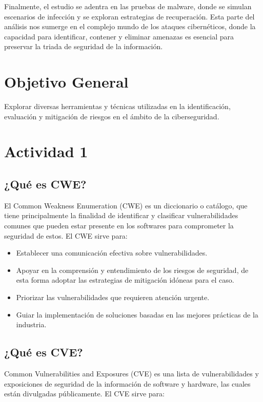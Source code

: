 \documentclass[stu, 11pt, letterpaper, donotrepeattitle, floatsintext, natbib]{apa7}
\begin{document}
Finalmente, el estudio se adentra en las pruebas de malware, donde se simulan escenarios de infección y se exploran estrategias de recuperación. Esta parte del análisis nos sumerge en el complejo mundo de los ataques cibernéticos, donde la capacidad para identificar, contener y eliminar amenazas es esencial para preservar la triada de seguridad de la información. 

\hfill \break 
\section{\large Objetivo General}

Explorar diversas herramientas y técnicas utilizadas en la identificación, evaluación y mitigación de riesgos en el ámbito de la ciberseguridad. 

\newpage

\section{\large Actividad 1}

\subsection{¿Qué es CWE?} 

El Common Weakness Enumeration (CWE) es un diccionario o catálogo, que tiene principalmente la finalidad de identificar y clasificar vulnerabilidades comunes que pueden estar presente en los softwares para comprometer la seguridad de estos. El CWE sirve para:

\begin{itemize}
\item Establecer una comunicación efectiva sobre vulnerabilidades.
\item Apoyar en la comprensión y entendimiento de los riesgos de seguridad, de esta forma adoptar las estrategias de mitigación idóneas para el caso.
\item Priorizar las vulnerabilidades que requieren atención urgente.
\item Guiar la implementación de soluciones basadas en las mejores prácticas de la industria.
\end{itemize}

\subsection{¿Qué es CVE?} 

Common Vulnerabilities and Exposures (CVE) es una lista de vulnerabilidades y exposiciones de seguridad de la información de software y hardware, las cuales están divulgadas públicamente. El CVE sirve para:
\end{document}
